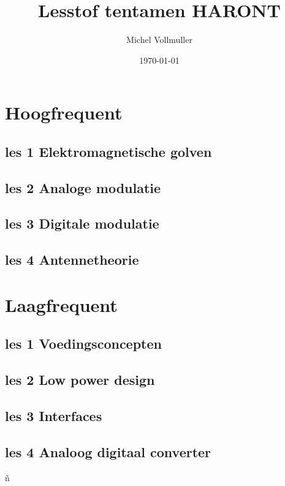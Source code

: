 \documentclass{article}
\begin{document}
\title{Lesstof tentamen HARONT}
\author{Michel Vollmuller}
\date{\today}

\maketitle


\tableofcontents

\newpage

\section{Hoogfrequent}

    \subsection{les 1 Elektromagnetische golven}
    

    \newpage
    \subsection{les 2 Analoge modulatie}
    

    \newpage
    \subsection{les 3 Digitale modulatie}
    

    \subsection{les 4 Antennetheorie}
    

\newpage

\section{Laagfrequent}

    \subsection{les 1 Voedingsconcepten}
    

    \subsection{les 2 Low power design}
    

    \subsection{les 3 Interfaces}
    

    \subsection{les 4 Analoog digitaal converter}
    

\newpage
ñ
\end{document}
